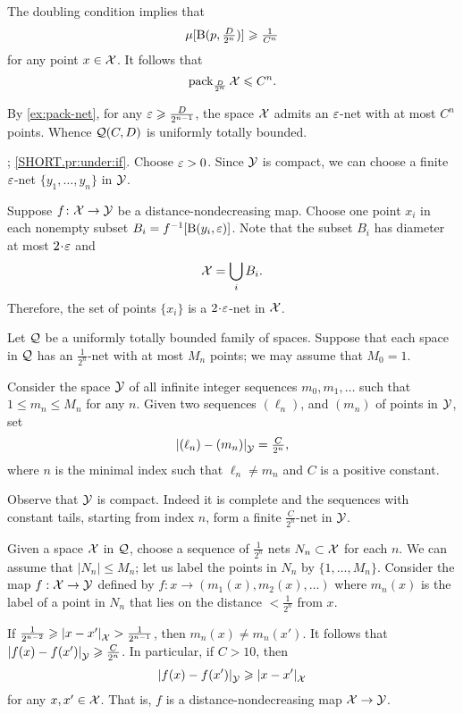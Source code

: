 The doubling condition implies that 
\[\mu[\mathrm{B}{}(p,\tfrac D{2^n})]\geqslant\tfrac 1{C^n}\]
for any point $x\in \mathcal{X}$.
It follows that 
\[\operatorname{\rm pack}\nolimits_{\frac D{2^n}}\mathcal{X}\leqslant C^n.\]

By \ref{ex:pack-net}, for any $\varepsilon\geqslant\frac D{2^{n-1}}$, the space $\mathcal{X}$ admits an $\varepsilon$-net with at most $C^n$ points.
Whence $\mathcal{Q}(C,D)$ is uniformly totally bounded.

\parbf{\ref{pr:under}}; \ref{SHORT.pr:under:if}.
Choose $\varepsilon>0$.
Since $\mathcal{Y}$ is compact, we can choose a finite $\varepsilon$-net $\{y_1,\dots,y_{n}\}$ in $\mathcal{Y}$.

Suppose $f\colon\mathcal{X}\to \mathcal{Y}$ be a distance-nondecreasing map.
Choose one point $x_i$ in each nonempty subset $B_i=f^{-1}[\mathrm{B}{}(y_i,\varepsilon)]$.
Note that the subset $B_i$ has diameter at most $2\cdot \eps$ and 
\[\mathcal{X}=\bigcup_iB_i.\]
Therefore, the set of points $\{x_i\}$ is a $2\cdot\eps$-net in $\mathcal{X}$.

 Let $\mathcal{Q}$ be a uniformly totally bounded family of spaces. 
Suppose that each space in $\mathcal{Q}$ has an $\tfrac1{2^n}$-net with at most $M_n$ points; we may assume that $M_0=1$.

Consider the space $\mathcal{Y}$ of all infinite integer sequences $m_0,m_1,\dots$ such that $1\le m_n\le M_n$ for any $n$.
Given two sequences $(\ell_n)$, and $(m_n)$ of points in $\mathcal{Y}$, set 
\[\dist{(\ell_n)}{(m_n)}{\spc{Y}}=\tfrac C{2^{n}},\]
where $n$ is the minimal index such that $\ell_n\ne m_n$ and $C$ is a positive constant.

Observe that $\mathcal{Y}$ is compact.
Indeed it is complete and the sequences with constant tails, starting from index $n$, form a finite $\tfrac C{2^{n}}$-net in $\mathcal{Y}$.

Given a space $\mathcal{X}$ in $\mathcal{Q}$,
choose a sequence of $\tfrac1{2^n}$ nets 
$N_n\subset\mathcal{X}$ for each $n$.
We can assume that $|N_n|\le M_n$; let us label the points in $N_n$ by $\{1,\dots,M_n\}$.
Consider the map $f:\mathcal{X}\to\mathcal{Y}$ defined by $f:x\to (m_1(x),m_2(x),\dots)$ where $m_n(x)$ is the label of a point in $N_n$ that lies on the distance $<\tfrac1{2^n}$ from $x$.

If $\tfrac1{2^{n-2}}\ge \dist{x}{x'}{\spc{X}}>\tfrac1{2^{n-1}}$, then $m_n(x)\ne m_n(x')$.
It follows that $\dist{f(x)}{f(x')}{\spc{Y}}\ge \tfrac C{2^{n}}$.
In particular, if $C>10$, then 
\[\dist{f(x)}{f(x')}{\spc{Y}}\ge \dist{x}{x'}{\spc{X}}\]
for any $x,x'\in \mathcal{X}$.
That is, $f$ is a distance-nondecreasing map $\mathcal{X}\to \mathcal{Y}$.

